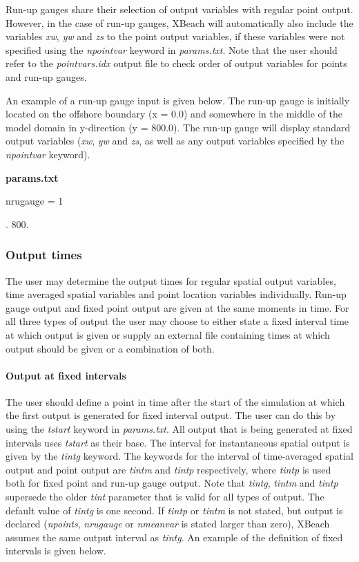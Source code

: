 \documentclass{article}
\begin{document}
\noindent Run-up gauges share their selection of output variables with regular point output. However, in the case of run-up gauges, XBeach will automatically also include the variables \textit{xw}, \textit{yw} and \textit{zs} to the point output variables, if these variables were not specified using the \textit{npointvar} keyword in \textit{params.txt}. Note that the user should refer to the \textit{pointvars.idx} output file to check order of output variables for points and run-up gauges.

\noindent An example of a run-up gauge input is given below. The run-up gauge is initially located on the offshore boundary (x = 0.0) and somewhere in the middle of the model domain in y-direction (y = 800.0). The run-up gauge will display standard output variables (\textit{xw}, \textit{yw} and \textit{zs}, as well as any output variables specified by the \textit{npointvar} keyword).

\noindent \textbf{params.txt}

\noindent nrugauge = 1

. 800. 


\subsubsection{ Output times}

\noindent The user may determine the output times for regular spatial output variables, time averaged spatial variables and point location variables individually. Run-up gauge output and fixed point output are given at the same moments in time. For all three types of output the user may choose to either state a fixed interval time at which output is given or supply an external file containing times at which output should be given or a combination of both. 


\paragraph{ Output at fixed intervals}

\noindent The user should define a point in time after the start of the simulation at which the first output is generated for fixed interval output. The user can do this by using the \textit{tstart} keyword in \textit{params.txt}. All output that is being generated at fixed intervals uses \textit{tstart} as their base. The interval for instantaneous spatial output is given by the \textit{tintg} keyword. The keywords for the interval of time-averaged spatial output and point output are \textit{tintm} and \textit{tintp} respectively, where \textit{tintp} is used both for fixed point and run-up gauge output. Note that \textit{tintg}, \textit{tintm} and \textit{tintp} supersede the older \textit{tint} parameter that is valid for all types of output. The default value of \textit{tintg} is one second. If \textit{tintp} or \textit{tintm} is not stated, but output is declared (\textit{npoints}, \textit{nrugauge} or \textit{nmeanvar} is stated larger than zero), XBeach assumes the same output interval as \textit{tintg}. An example of the definition of fixed intervals is given below.
\end{document}
